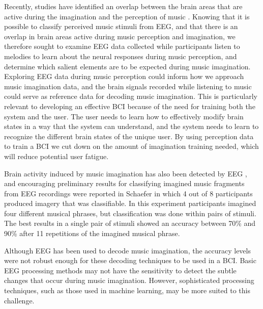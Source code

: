 Recently, studies have identified an overlap between the brain areas that are active during the imagination and the perception of music \cite{halpern_fmri_2004,Kraemer2005,Herholz2008,herholz_2012}. 
Knowing that it is possible to classify perceived music stimuli from EEG, and that there is an overlap in brain areas active during music perception and imagination, we therefore sought to examine \ac{EEG} data collected while participants listen to melodies to learn about the neural responses during music perception, and determine which salient elements are to be expected during music imagination.
Exploring EEG data during music perception could inform how we approach music imagination data, and the brain signals recorded while listening to music could serve as reference data for decoding music imagination. 
This is particularly relevant to developing an effective \ac{BCI} because of the need for training both the system and the user.
The user needs to learn how to effectively modify brain states in a way that the system can understand, and the system needs to learn to recognize the different brain states of the unique user.
By using perception data to train a \ac{BCI} we cut down on the amount of imagination training needed, which will reduce potential user fatigue.

Brain activity induced by music imagination has also been detected by \ac{EEG} \cite{schaefer_shared_2013}, and encouraging preliminary results for classifying imagined music fragments from \ac{EEG} recordings were reported in Schaefer \etal \citeyear{schaefer_single_2009} in which 4 out of 8 participants produced imagery that was classifiable. 
In this experiment participants imagined four different musical phrases, but classification was done within pairs of stimuli.
The best results in a single pair of stimuli showed an accuracy between 70\% and 90\% after 11 repetitions of the imagined musical phrase. 

Although \ac{EEG} has been used to decode music imagination, the accuracy levels were not robust enough for these decoding techniques to be used in a \ac{BCI}. 
Basic EEG processing methods may not have the sensitivity to detect the subtle changes that occur during music imagination. 
However, sophisticated processing techniques, such as those used in machine learning, may be more suited to this challenge. 

